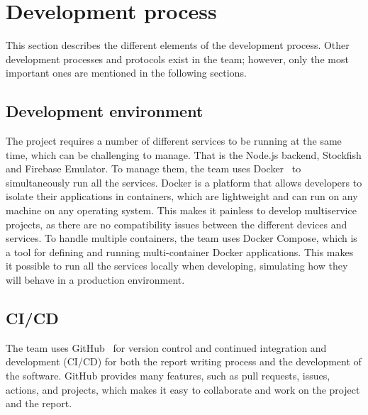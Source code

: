 \section{Development process}\label{sec:development-process}

This section describes the different elements of the development process.
Other development processes and protocols exist in the team; however, only the most important ones are mentioned in the
following sections.


\subsection{Development environment}\label{subsec:development-environment}

The project requires a number of different services to be running at the same time, which can be challenging to manage.
That is the Node.js backend, Stockfish and Firebase Emulator.
To manage them, the team uses Docker~\cite{docker} to simultaneously run all the services.
Docker is a platform that allows developers to isolate their applications in containers, which are lightweight and can
run on any machine on any operating system.
This makes it painless to develop multiservice projects, as there are no compatibility issues between the different
devices and services.
To handle multiple containers, the team uses Docker Compose, which is a tool for defining and running multi-container
Docker applications.
This makes it possible to run all the services locally when developing, simulating how they will behave in a production
environment.


\subsection{CI/CD}\label{subsec:ci/cd}

The team uses GitHub~\cite{github} for version control and continued integration and development (CI/CD) for both the
report writing process and the development of the software.
GitHub provides many features, such as pull requests, issues, actions, and projects, which makes it easy to collaborate
and work on the project and the report.

